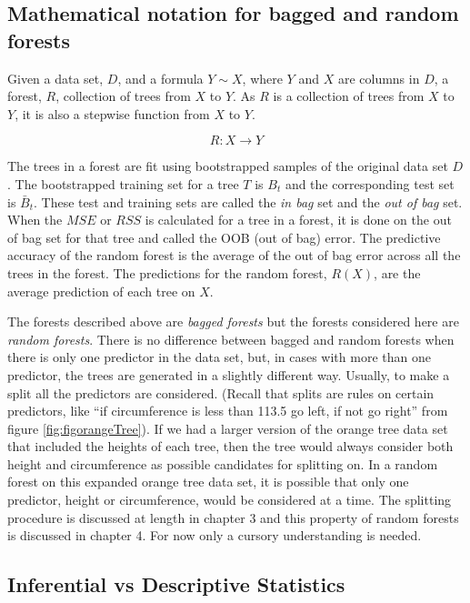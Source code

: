 \documentclass[12pt,twoside]{reedthesis}
\begin{document}
  \subsection{Mathematical notation for bagged and random
  forests}\label{mathematical-notation-for-bagged-and-random-forests}
  
  Given a data set, \(D\), and a formula \(Y \sim X\), where \(Y\) and
  \(X\) are columns in \(D\), a forest, \(R\), collection of trees from
  \(X\) to \(Y\). As \(R\) is a collection of trees from \(X\) to \(Y\),
  it is also a stepwise function from \(X\) to \(Y\).
  
  \[R:X \rightarrow Y\]
  
  The trees in a forest are fit using bootstrapped samples of the original
  data set \(D\). The bootstrapped training set for a tree \(T\) is
  \(B_t\) and the corresponding test set is \(\bar{B}_t\). These test and
  training sets are called the \emph{in bag} set and the \emph{out of bag}
  set. When the \(MSE\) or \(RSS\) is calculated for a tree in a forest,
  it is done on the out of bag set for that tree and called the OOB (out
  of bag) error. The predictive accuracy of the random forest is the
  average of the out of bag error across all the trees in the forest. The
  predictions for the random forest, \(R(X)\), are the average prediction
  of each tree on \(X\).
  
  The forests described above are \emph{bagged forests} but the forests
  considered here are \emph{random forests}. There is no difference
  between bagged and random forests when there is only one predictor in
  the data set, but, in cases with more than one predictor, the trees are
  generated in a slightly different way. Usually, to make a split all the
  predictors are considered. (Recall that splits are rules on certain
  predictors, like ``if circumference is less than 113.5 go left, if not
  go right'' from figure \ref{fig:figorangeTree}). If we had a larger
  version of the orange tree data set that included the heights of each
  tree, then the tree would always consider both height and circumference
  as possible candidates for splitting on. In a random forest on this
  expanded orange tree data set, it is possible that only one predictor,
  height or circumference, would be considered at a time. The splitting
  procedure is discussed at length in chapter 3 and this property of
  random forests is discussed in chapter 4. For now only a cursory
  understanding is needed.
  
  \subsection{Inferential vs Descriptive
  Statistics}\label{inferential-vs-descriptive-statistics}
  
\end{document}
